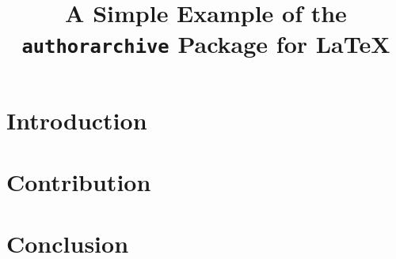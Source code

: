 \documentclass[conference]{IEEEtran}
\title{A Simple Example of the \texttt{authorarchive} Package for \LaTeX}
\author{%
    \IEEEauthorblockN{\protect\href{http://www.brucker.ch/}{Achim D. Brucker}}
    \IEEEauthorblockA{Some Department \\ Somewhere}
}
\begin{document}
  \maketitle{}

  \begin{abstract}
      \lipsum[1-2]
  \end{abstract}

  \section{Introduction}
  \lipsum[1-4]

  \section{Contribution}
  \lipsum[5-10]

  \section{Conclusion}
  \lipsum[11-12]
\end{document}
